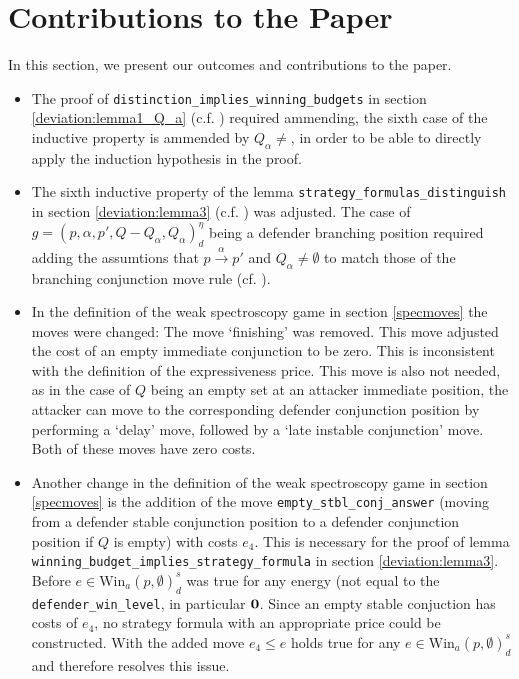 \newpage
\section{Contributions to the Paper}
In this section, we present our outcomes and contributions to the paper.
\begin{itemize}
    \item The proof of \texttt{distinction\_implies\_winning\_budgets} in section \ref{deviation:lemma1_Q_a} 
    (c.f. \cite[lemma $1$]{bisping2023lineartimebranchingtime}) required ammending, the sixth case
    of the inductive property is ammended by $Q_\alpha \neq {}$, in order to be able to directly
    apply the induction hypothesis in the proof.

    \item The sixth inductive property of the lemma \texttt{strategy\_formulas\_distinguish} in section \ref{deviation:lemma3} 
    (c.f. \cite[lemma $3$]{bisping2023lineartimebranchingtime}) was adjusted.
    The case of $g=(p,\alpha ,p', Q- Q_\alpha, Q_\alpha)_d^\eta$ being a defender branching position
    required adding the assumtions that $p \overset{\alpha}{\longrightarrow} p'$ and $Q_\alpha \neq \emptyset$
    to match those of the branching conjunction move rule (cf. \cite[p. 13]{bisping2023lineartimebranchingtime}). 

    \item In the definition of the weak spectroscopy game in section \ref{specmoves} the moves were changed: 
    The move `finishing' was removed. This move adjusted the cost of an empty immediate conjunction to be zero.
    This is inconsistent with the definition of the expressiveness price. This move is also not needed, as in the case of $Q$ being an empty set at an attacker immediate position, the attacker can move to the corresponding
    defender conjunction position by performing a `delay' move, followed by a `late instable conjunction' move. Both of these moves have zero costs.

    \item Another change in the definition of the weak spectroscopy game in section \ref{specmoves} is the addition of the move \texttt{empty\_stbl\_conj\_answer} (moving from a defender stable conjunction position to a defender conjunction
    position if $Q$ is empty) with costs $e_4$. This is necessary for the proof of lemma\\ 
    \texttt{winning\_budget\_implies\_strategy\_formula} in section \ref{deviation:lemma3}. Before 
    $e \in \text{Win}_a (p, \emptyset)_d^s $ was true for any energy (not equal to the \texttt{defender\_win\_level}, in particular $\bold{0}$. 
    Since an empty stable conjuction has costs of $e_4$, no strategy formula with an appropriate price could be constructed. 
    With the added move $e_4 \leq e $ holds true for any $e \in \text{Win}_a (p, \emptyset)_d^s $ and therefore resolves this issue.


\end{itemize}
